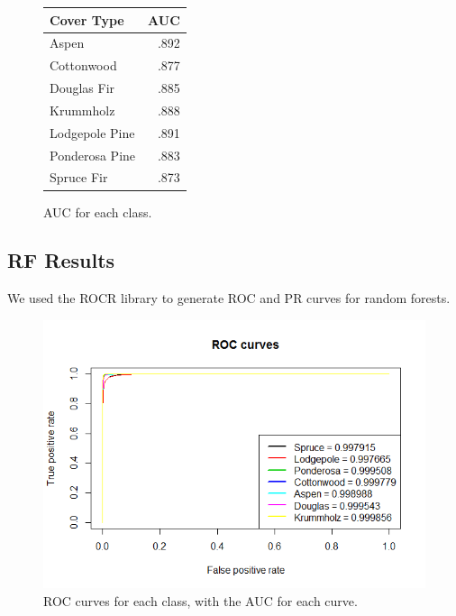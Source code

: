 \documentclass[12pt]{article}
\begin{document}
     \begin{figure}[H]
     \begin{center}
     \begin{tabular}{ l | r}
       \hline
       Cover Type & AUC \\ \hline
     
       Aspen & .892 \\ \hline
       Cottonwood & .877 \\ \hline
       Douglas Fir & .885 \\ \hline
       Krummholz & .888 \\ \hline
       Lodgepole Pine & .891 \\ \hline
       Ponderosa Pine & .883 \\ \hline
       Spruce Fir & .873 \\ \hline
     \end{tabular}
    \end{center}
    \caption{AUC for each class.}
     \end{figure}
    
    
\subsection{RF Results}
We used the ROCR library \cite{ROCR} to generate ROC and PR curves for random forests.

\begin{figure}[H]
\includegraphics[width=\linewidth]{images/RFROC.png}
\caption{ROC curves for each class, with the AUC for each curve.}
\end{figure}
\end{document}
